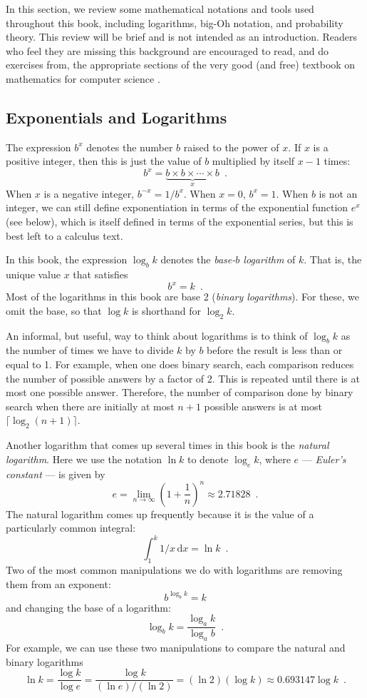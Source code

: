 In this section, we review some mathematical notations and tools used throughout this book, including logarithms, big-Oh notation, and probability theory.  This review will be brief and is not intended as an introduction. Readers who feel they are missing this background are encouraged to read, and do exercises from, the appropriate sections of the very good (and free) textbook on mathematics for computer science \cite{llm11}.

\subsection{Exponentials and Logarithms}

The expression $b^x$ denotes the number $b$ raised to the power of $x$.  If $x$ is a positive integer, then this is just the value of $b$ multiplied by itself $x-1$ times:
\[
    b^x = \underbrace{b\times b\times \cdots \times b}_{x} \enspace .
\]
When $x$ is a negative integer, $b^{-x}=1/b^{x}$.  When $x=0$, $b^x=1$.  When $b$ is not an integer, we can still define exponentiation in terms of the exponential function $e^x$ (see below), which is itself defined in terms of the exponential series, but this is best left to a calculus text.

In this book, the expression $\log_b k$ denotes the \emph{base-$b$ logarithm} of $k$.  That is, the unique value $x$ that satisfies
\[
    b^{x} = k  \enspace .
\]
Most of the logarithms in this book are base 2 (\emph{binary logarithms}).    For these, we omit the base, so that $\log k$ is shorthand for $\log_2 k$.

An informal, but useful, way to think about logarithms is to think of $\log_b k$ as the number of times we have to divide $k$ by $b$ before the result is less than or equal to 1.  For example, when one does binary search, each comparison reduces the number of possible answers by a factor of 2.  This is repeated until there is at most one possible answer.  Therefore, the number of comparison done by binary search when there are initially at most $n+1$ possible answers is at most $\lceil\log_2(n+1)\rceil$.

Another logarithm that comes up several times in this book is the \emph{natural logarithm}.  Here we use the notation $\ln k$ to denote $\log_e k$, where $e$ --- \emph{Euler's constant} --- is given by  
\[
   e = \lim_{n\rightarrow\infty} \left(1+\frac{1}{n}\right)^n
   \approx  2.71828 \enspace .
\]
The natural logarithm comes up frequently because it is the value of a particularly common integral:
\[
    \int_{1}^{k} 1/x\,\mathrm{d}x  = \ln k \enspace .
\]
Two of the most common manipulations we do with logarithms are removing them from an exponent:
\[
    b^{\log_b k} = k
\]
and changing the base of a logarithm:
\[
    \log_b k = \frac{\log_a k}{\log_a b} \enspace .
\]
For example, we can use these two manipulations to compare the natural and binary logarithms
\[
   \ln k = \frac{\log k}{\log e} = \frac{\log k}{(\ln e)/(\ln 2)} = 
    (\ln 2)(\log k) \approx 0.693147\log k \enspace .
\]

